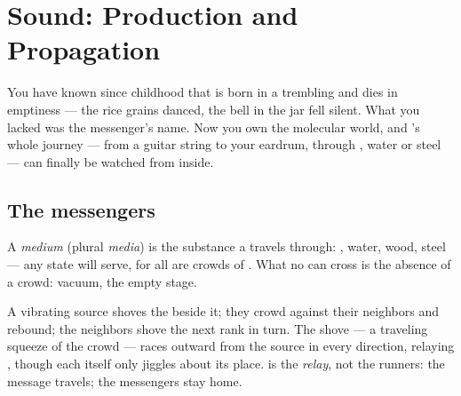 \chapter{Sound: Production and Propagation}\label{ch:g7:sound-production}

You have known since childhood that  is born in a trembling
and dies in emptiness --- the rice grains danced, the bell in the
jar fell silent. What you lacked was the messenger's name. Now
you own the molecular world, and 's whole journey --- from
a guitar string to your eardrum, through , water or steel ---
can finally be watched from inside.

\section{The messengers}

\begin{definition}[Medium]\label{def:g7:sound-production:medium}
A \emph{medium} (plural \emph{media}) is the
substance a  travels through: , water, wood, steel ---
any state will serve, for all are crowds of . What no
 can cross is the absence of a crowd: vacuum, the empty
stage.
\end{definition}

\begin{proposition}\label{prop:g7:sound-production:travel}
A vibrating source shoves the  beside it; they crowd
against their neighbors and rebound; the neighbors shove the
next rank in turn. The shove --- a traveling squeeze of the
crowd --- races outward from the source in every direction,
 relaying , though each  itself only
jiggles about its place.  is the \emph{relay}, not the
runners: the message travels; the messengers stay home.
\end{proposition}

